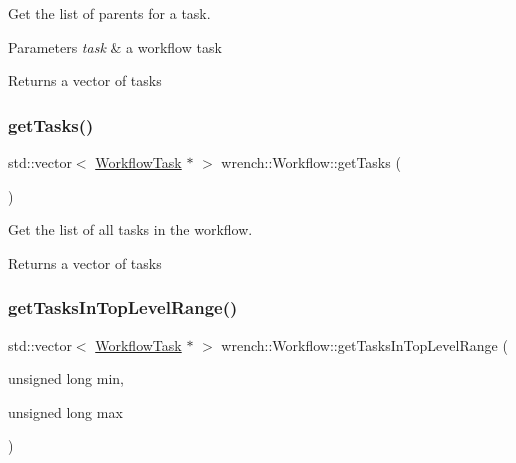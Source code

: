Get the list of parents for a task. 


\begin{DoxyParams}{Parameters}
{\em task} & a workflow task\\
\hline
\end{DoxyParams}
\begin{DoxyReturn}{Returns}
a vector of tasks 
\end{DoxyReturn}
\mbox{\label{classwrench_1_1_workflow_abc742b44f0895ae2a42e60c63621f8aa}} 
\subsubsection{\texorpdfstring{get\+Tasks()}{getTasks()}}
{\footnotesize\ttfamily std\+::vector$<$ \hyperlink{classwrench_1_1_workflow_task}{Workflow\+Task} $\ast$ $>$ wrench\+::\+Workflow\+::get\+Tasks (\begin{DoxyParamCaption}{ }\end{DoxyParamCaption})}



Get the list of all tasks in the workflow. 

\begin{DoxyReturn}{Returns}
a vector of tasks 
\end{DoxyReturn}
\mbox{\label{classwrench_1_1_workflow_a7d8044bd686157c24b89c53810cb2b1b}} 
\subsubsection{\texorpdfstring{get\+Tasks\+In\+Top\+Level\+Range()}{getTasksInTopLevelRange()}}
{\footnotesize\ttfamily std\+::vector$<$ \hyperlink{classwrench_1_1_workflow_task}{Workflow\+Task} $\ast$ $>$ wrench\+::\+Workflow\+::get\+Tasks\+In\+Top\+Level\+Range (\begin{DoxyParamCaption}\item[{unsigned long}]{min,  }\item[{unsigned long}]{max }\end{DoxyParamCaption})}



